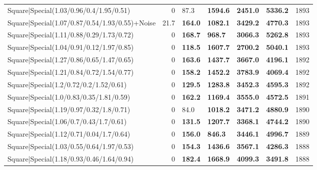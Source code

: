 \begin{tabular}{lrllllr}
 Square|Special(1.03/0.96/0.4/1.95/0.51)                       &             0   & 87.3           & \textbf{1594.6} & \textbf{2451.0} & \textbf{5336.2} &         1893 \\
 Square|Special(1.07/0.87/0.54/1.93/0.55)+Noise                &            21.7 & \textbf{164.0} & \textbf{1082.1} & \textbf{3429.2} & \textbf{4770.3} &         1893 \\
 Square|Special(1.11/0.88/0.29/1.73/0.72)                      &             0   & \textbf{168.7} & \textbf{968.7}  & \textbf{3066.3} & \textbf{5262.8} &         1893 \\
 Square|Special(1.04/0.91/0.12/1.97/0.85)                      &             0   & \textbf{118.5} & \textbf{1607.7} & \textbf{2700.2} & \textbf{5040.1} &         1893 \\
 Square|Special(1.27/0.86/0.65/1.47/0.65)                      &             0   & \textbf{163.6} & \textbf{1437.7} & \textbf{3667.0} & \textbf{4196.1} &         1892 \\
 Square|Special(1.21/0.84/0.72/1.54/0.77)                      &             0   & \textbf{158.2} & \textbf{1452.2} & \textbf{3783.9} & \textbf{4069.4} &         1892 \\
 Square|Special(1.2/0.72/0.2/1.52/0.61)                        &             0   & \textbf{129.5} & \textbf{1283.8} & \textbf{3452.3} & \textbf{4595.3} &         1892 \\
 Square|Special(1.0/0.83/0.35/1.81/0.59)                       &             0   & \textbf{162.2} & \textbf{1169.4} & \textbf{3555.0} & \textbf{4572.5} &         1891 \\
 Square|Special(1.19/0.97/0.32/1.8/0.71)                       &             0   & 84.0           & \textbf{1018.2} & \textbf{3471.2} & \textbf{4880.9} &         1890 \\
 Square|Special(1.06/0.7/0.43/1.7/0.61)                        &             0   & \textbf{131.5} & \textbf{1207.7} & \textbf{3368.1} & \textbf{4744.2} &         1890 \\
 Square|Special(1.12/0.71/0.04/1.7/0.64)                       &             0   & \textbf{156.0} & \textbf{846.3}  & \textbf{3446.1} & \textbf{4996.7} &         1889 \\
 Square|Special(1.03/0.55/0.64/1.97/0.53)                      &             0   & \textbf{154.3} & \textbf{1436.6} & \textbf{3567.1} & \textbf{4286.3} &         1888 \\
 Square|Special(1.18/0.93/0.46/1.64/0.94)                      &             0   & \textbf{182.4} & \textbf{1668.9} & \textbf{4099.3} & \textbf{3491.8} &         1888 \\

\end{tabular}
